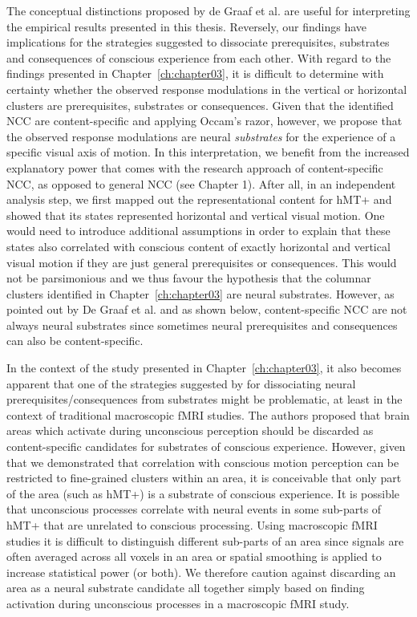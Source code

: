 The conceptual distinctions proposed by de Graaf et al. are useful for interpreting the empirical results presented in this thesis. Reversely, our findings have implications for the strategies suggested to dissociate prerequisites, substrates and consequences of conscious experience from each other. With regard to the findings presented in Chapter~\ref{ch:chapter03}, it is difficult to determine with certainty whether the observed response modulations in the vertical or horizontal clusters are prerequisites, substrates or consequences. Given that the identified NCC are content-specific and applying Occam's razor, however, we propose that the observed response modulations are neural \textit{substrates} for the experience of a specific visual axis of motion. In this interpretation, we benefit from the increased explanatory power that comes with the research approach of content-specific NCC, as opposed to general NCC (see Chapter 1). After all, in an independent analysis step, we first mapped out the representational content for hMT+ and showed that its states represented horizontal and vertical visual motion. One would need to introduce additional assumptions in order to explain that these states also correlated with conscious content of exactly horizontal and vertical visual motion if they are just general prerequisites or consequences. This would not be parsimonious and we thus favour the hypothesis that the columnar clusters identified in Chapter~\ref{ch:chapter03} are neural substrates. However, as pointed out by De Graaf et al. \parencite*{DeGraaf2012} and as shown below, content-specific NCC are not always neural substrates since sometimes neural prerequisites and consequences can also be content-specific.

In the context of the study presented in Chapter~\ref{ch:chapter03}, it also becomes apparent that one of the strategies suggested by \cite{DeGraaf2012} for dissociating neural prerequisites/consequences from substrates might be problematic, at least in the context of traditional macroscopic fMRI studies. The authors proposed that brain areas which activate during unconscious perception should be discarded as content-specific candidates for substrates of conscious experience. However, given that we demonstrated that correlation with conscious motion perception can be restricted to fine-grained clusters within an area, it is conceivable that only part of the area (such as hMT+) is a substrate of conscious experience. It is possible that unconscious processes correlate with neural events in some sub-parts of hMT+ that are unrelated to conscious processing. Using macroscopic fMRI studies it is difficult to distinguish different sub-parts of an area since signals are often averaged across all voxels in an area or spatial smoothing is applied to increase statistical power (or both). We therefore caution against discarding an area as a neural substrate candidate all together simply based on finding activation during unconscious processes in a macroscopic fMRI study.

